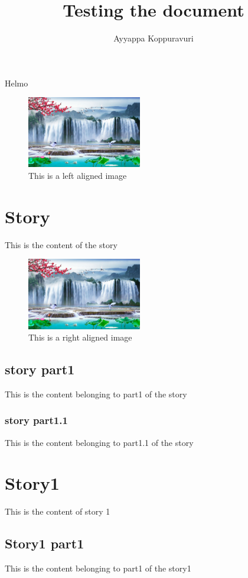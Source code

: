 \documentclass{article}
\title{Testing the document}
\author{Ayyappa Koppuravuri}
\begin{document}
\maketitle
\tableofcontents

\newpage
Helmo


\begin{figure}[h]
	\raggedright
	\includegraphics[width=5cm]{image1.jpg}
	\caption{This is a left aligned image}
\end{figure}

\section{Story}
This is the content of the story

\begin{figure}[h]
	\raggedleft
	\includegraphics[width=5cm]{image1.jpg}
	\caption{This is a right aligned image}
\end{figure}



\subsection{story part1}
This is the content belonging to part1 of the story

\subsubsection{story part1.1}
This is the content belonging to part1.1 of the story

\section*{Story1}
This is the content of story 1
\newpage


\subsection*{Story1 part1}
This is the content belonging to part1 of the story1
\end{document}

